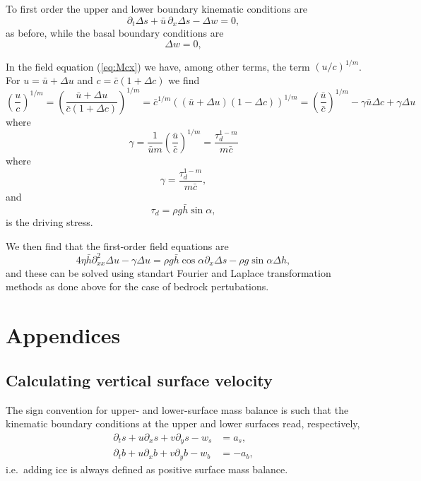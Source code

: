 \documentclass[10pt,a4paper]{book}
\newcommand{\p}{\partial}
\begin{document}
To first order the upper and lower boundary kinematic conditions are	
\begin{equation}	
\p_t \Delta s +\bar{u} \, \p_x \Delta s -\Delta w =0 ,\label{eq:ksc}		
\end{equation}	
as before, while the basal boundary conditions are	
\begin{equation}	
\Delta w =0 ,
\end{equation}	

In the field equation (\ref{eq:Mcx}) we have, among other terms, the
term $(u/c)^{1/m}$. For $u=\bar{u}+\Delta u$ and $c=\bar{c}(1+\Delta
c)$ we find
\[
\left ( \frac{u}{c} \right )^{1/m} = \left 
( \frac{\bar{u}+\Delta u}{\bar{c}(1+\Delta c)}
\right )^{1/m}
=\bar{c}^{1/m} ((\bar{u}+\Delta u)(1-\Delta c))^{1/m}
=\left( \frac{\bar{u}}{\bar{c}}\right )^{1/m} -\gamma \bar{u} \Delta c +\gamma \Delta u
\]
where
\[
\gamma=\frac{1}{\bar{u} m} \left ( \frac{\bar{u}}{\bar{c}} \right )^{1/m} 
= \frac{\tau_d^{1-m}}{m \bar{c}}
\]
where
\begin{equation}
\gamma=\frac{\tau_d^{1-m}}{m \bar{c}} ,
\end{equation}
and 
\begin{equation} 
\tau_d=\rho g \bar{h} \sin \alpha,
\end{equation}
is the driving stress. 

We then find that the first-order field equations are
\begin{equation}
4 \eta \bar{h} \p^2_{xx} \Delta u  -\gamma \Delta u 
=\rho g \bar{h} \cos \alpha \p_x \Delta s - \rho g \sin \alpha \Delta h,
\end{equation}
and these can be solved using standart Fourier and Laplace
transformation methods as done above for the case of bedrock
pertubations.


\part{Appendices}
\appendix



\chapter{Calculating vertical surface velocity}

The sign convention for upper- and lower-surface mass balance is such
that the kinematic boundary conditions at the upper and
lower surfaces read, respectively,
\begin{align} 
\p_t s + u \p_x s +v \p_y s -w_s&=a_s  ,\label{eq:pts} \\
\p_t b + u \p_x b +v \p_y b -w_b&=-a_b ,\label{eq:ptb} 
\end{align}
i.e.\ adding ice is always defined as positive surface mass balance.
\end{document}
